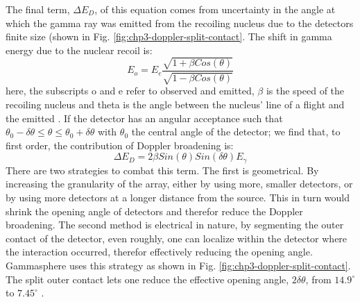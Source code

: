 The final term, $\Delta{}E_{D}$, of this equation comes from uncertainty in the angle at which the gamma ray was emitted from the recoiling nucleus due to the detectors finite size (shown in Fig. \ref{fig:chp3-doppler-split-contact}. The shift in gamma energy due to the nuclear recoil is:
\begin{equation}
\label{eqn:doppler_formula} 
E_{o} = E_{e}\frac{\sqrt{1+\beta{}Cos(\theta)}}{\sqrt{1-\beta{}Cos(\theta)}}
\end{equation}
here, the subscripts o and e refer to observed and emitted, $\beta$ is the speed of the recoiling nucleus and theta is the angle between the nucleus' line of a flight and the emitted \gr{}. If the detector has an angular acceptance such that $\theta{}_{0}-\delta{}\theta{}\leq{}\theta{}\leq{}\theta{}_{0}+\delta{}\theta{}$ with $\theta{}_{0}$ the central angle of the detector; we find that, to first order, the contribution of Doppler broadening is:
\begin{equation}
\label{eqn:res-doppler-term} 
\Delta{}E_{D} = 2\beta{}Sin(\theta{})Sin(\delta{}\theta{})E_{\gamma}
\end{equation}
There are two strategies to combat this term. The first is geometrical. By increasing the granularity of the array, either by using more, smaller detectors, or by using more detectors at a longer distance from the source. This in turn would shrink the opening angle of detectors and therefor reduce the Doppler broadening. The second method is electrical in nature, by segmenting the outer contact of the detector, even roughly, one can localize within the detector where the interaction occurred, therefor effectively reducing the opening angle. Gammasphere uses this strategy as shown in Fig. \ref{fig:chp3-doppler-split-contact}. The split outer contact lets one reduce the effective opening angle, $2\delta{}\theta{}$, from $14.9^{\circ}$ to $7.45^{\circ}$ \cite{TheGS}.

